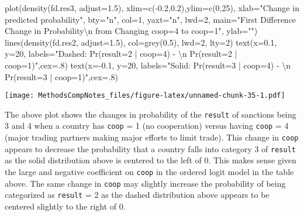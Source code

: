 \documentclass[
]{article}
\newenvironment{Shaded}{\begin{snugshade}}{\end{snugshade}}
\newcommand{\AttributeTok}[1]{\textcolor[rgb]{0.77,0.63,0.00}{#1}}
\newcommand{\DecValTok}[1]{\textcolor[rgb]{0.00,0.00,0.81}{#1}}
\newcommand{\FloatTok}[1]{\textcolor[rgb]{0.00,0.00,0.81}{#1}}
\newcommand{\FunctionTok}[1]{\textcolor[rgb]{0.00,0.00,0.00}{#1}}
\newcommand{\NormalTok}[1]{#1}
\newcommand{\SpecialCharTok}[1]{\textcolor[rgb]{0.00,0.00,0.00}{#1}}
\newcommand{\StringTok}[1]{\textcolor[rgb]{0.31,0.60,0.02}{#1}}
\begin{document}
\begin{Shaded}
\begin{Highlighting}[]
\FunctionTok{plot}\NormalTok{(}\FunctionTok{density}\NormalTok{(fd.res3, }\AttributeTok{adjust=}\FloatTok{1.5}\NormalTok{), }\AttributeTok{xlim=}\FunctionTok{c}\NormalTok{(}\SpecialCharTok{{-}}\FloatTok{0.2}\NormalTok{,}\FloatTok{0.2}\NormalTok{),}\AttributeTok{ylim=}\FunctionTok{c}\NormalTok{(}\DecValTok{0}\NormalTok{,}\DecValTok{25}\NormalTok{),}
     \AttributeTok{xlab=}\StringTok{"Change in predicted probability"}\NormalTok{, }\AttributeTok{bty=}\StringTok{"n"}\NormalTok{, }\AttributeTok{col=}\DecValTok{1}\NormalTok{,}
     \AttributeTok{yaxt=}\StringTok{"n"}\NormalTok{, }\AttributeTok{lwd=}\DecValTok{2}\NormalTok{, }\AttributeTok{main=}\StringTok{"First Difference Change in Probability}\SpecialCharTok{\textbackslash{}n}\StringTok{ from Changing coop=4 to coop=1"}\NormalTok{,}
     \AttributeTok{ylab=}\StringTok{""}\NormalTok{)}
\FunctionTok{lines}\NormalTok{(}\FunctionTok{density}\NormalTok{(fd.res2, }\AttributeTok{adjust=}\FloatTok{1.5}\NormalTok{), }\AttributeTok{col=}\FunctionTok{grey}\NormalTok{(}\FloatTok{0.5}\NormalTok{), }\AttributeTok{lwd=}\DecValTok{2}\NormalTok{, }\AttributeTok{lty=}\DecValTok{2}\NormalTok{)}
\FunctionTok{text}\NormalTok{(}\AttributeTok{x=}\FloatTok{0.1}\NormalTok{, }\AttributeTok{y=}\DecValTok{20}\NormalTok{, }\AttributeTok{labels=}\StringTok{"Dashed: Pr(result=2 | coop=4) {-}}
\StringTok{     }\SpecialCharTok{\textbackslash{}n}\StringTok{ Pr(result=2 | coop=1)"}\NormalTok{,}\AttributeTok{cex=}\NormalTok{.}\DecValTok{8}\NormalTok{)}
\FunctionTok{text}\NormalTok{(}\AttributeTok{x=}\SpecialCharTok{{-}}\FloatTok{0.1}\NormalTok{, }\AttributeTok{y=}\DecValTok{20}\NormalTok{, }\AttributeTok{labels=}\StringTok{"Solid: Pr(result=3 | coop=4) {-}}
\StringTok{     }\SpecialCharTok{\textbackslash{}n}\StringTok{ Pr(result=3 | coop=1)"}\NormalTok{,}\AttributeTok{cex=}\NormalTok{.}\DecValTok{8}\NormalTok{)}
\end{Highlighting}
\end{Shaded}

\texttt{[image: MethodsCompNotes\_files/figure-latex/unnamed-chunk-35-1.pdf]}

The above plot shows the changes in probability of the \texttt{result}
of sanctions being 3 and 4 when a country has \texttt{coop} = 1 (no
cooperation) versus having \texttt{coop} = 4 (major trading partners
making major efforts to limit trade). This change in \texttt{coop}
appears to decrease the probability that a country falls into category 3
of \texttt{result} as the solid distribution above is centered to the
left of 0. This makes sense given the large and negative coefficient on
\texttt{coop} in the ordered logit model in the table above. The same
change in \texttt{coop} may slightly increase the probability of being
categorized as \texttt{result} = 2 as the dashed distribution above
appears to be centered slightly to the right of 0.
\end{document}
